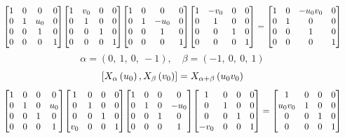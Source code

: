 \documentclass[11pt]{article}
\theoremstyle{definition}
\begin{document}
\[
\scaletoalign{\textwidth}{{\left[\begin{matrix}1 & 0 & 0 & 0\\0 & 1 & u_{0} & 0\\0 & 0 & 1 & 0\\0 & 0 & 0 & 1\end{matrix}\right]} {\left[\begin{matrix}1 & v_{0} & 0 & 0\\0 & 1 & 0 & 0\\0 & 0 & 1 & 0\\0 & 0 & 0 & 1\end{matrix}\right]} {\left[\begin{matrix}1 & 0 & 0 & 0\\0 & 1 & - u_{0} & 0\\0 & 0 & 1 & 0\\0 & 0 & 0 & 1\end{matrix}\right]} {\left[\begin{matrix}1 & - v_{0} & 0 & 0\\0 & 1 & 0 & 0\\0 & 0 & 1 & 0\\0 & 0 & 0 & 1\end{matrix}\right]} = {\left[\begin{matrix}1 & 0 & - u_{0} v_{0} & 0\\0 & 1 & 0 & 0\\0 & 0 & 1 & 0\\0 & 0 & 0 & 1\end{matrix}\right]}}
\]
\[
\alpha = \left( 0, \  1, \  0, \  -1\right), \quad \beta = \left( -1, \  0, \  0, \  1\right)
\]
\[
\scaletoalign{\textwidth}{\left[ X_{\alpha}\left(u_{0}\right), X_{\beta}\left(v_{0}\right) \right] = X_{\alpha + \beta}\left(u_{0} v_{0}\right)}
\]
\[
\scaletoalign{\textwidth}{{\left[\begin{matrix}1 & 0 & 0 & 0\\0 & 1 & 0 & u_{0}\\0 & 0 & 1 & 0\\0 & 0 & 0 & 1\end{matrix}\right]} {\left[\begin{matrix}1 & 0 & 0 & 0\\0 & 1 & 0 & 0\\0 & 0 & 1 & 0\\v_{0} & 0 & 0 & 1\end{matrix}\right]} {\left[\begin{matrix}1 & 0 & 0 & 0\\0 & 1 & 0 & - u_{0}\\0 & 0 & 1 & 0\\0 & 0 & 0 & 1\end{matrix}\right]} {\left[\begin{matrix}1 & 0 & 0 & 0\\0 & 1 & 0 & 0\\0 & 0 & 1 & 0\\- v_{0} & 0 & 0 & 1\end{matrix}\right]} = {\left[\begin{matrix}1 & 0 & 0 & 0\\u_{0} v_{0} & 1 & 0 & 0\\0 & 0 & 1 & 0\\0 & 0 & 0 & 1\end{matrix}\right]}}
\]
\end{document}
